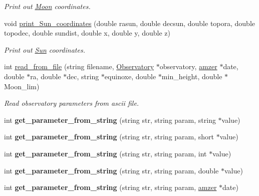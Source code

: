\begin{DoxyCompactItemize}
\begin{DoxyCompactList}\small\item\em Print out \hyperlink{class_moon}{Moon} coordinates. \end{DoxyCompactList}\item 
\hypertarget{class_observatory_a10149ab9daaed20dcb077412c07769ac}{void \hyperlink{class_observatory_a10149ab9daaed20dcb077412c07769ac}{print\-\_\-\-Sun\-\_\-coordinates} (double rasun, double decsun, double topora, double topodec, double sundist, double x, double y, double z)}\label{class_observatory_a10149ab9daaed20dcb077412c07769ac}

\begin{DoxyCompactList}\small\item\em Print out \hyperlink{class_sun}{Sun} coordinates. \end{DoxyCompactList}\item 
\hypertarget{class_observatory_ae9a3b0646ec53cf4a51881abe6889e05}{int \hyperlink{class_observatory_ae9a3b0646ec53cf4a51881abe6889e05}{read\-\_\-from\-\_\-file} (string filename, \hyperlink{class_observatory}{Observatory} $\ast$observatory, \hyperlink{classamzer}{amzer} $\ast$date, double $\ast$ra, double $\ast$dec, string $\ast$equinoxe, double $\ast$min\-\_\-height, double $\ast$Moon\-\_\-lim)}\label{class_observatory_ae9a3b0646ec53cf4a51881abe6889e05}

\begin{DoxyCompactList}\small\item\em Read observatory parameters from ascii file. \end{DoxyCompactList}\item 
\hypertarget{class_observatory_a3121cf61f411c22997b2af6b1915cf2f}{int {\bfseries get\-\_\-parameter\-\_\-from\-\_\-string} (string str, string param, string $\ast$value)}\label{class_observatory_a3121cf61f411c22997b2af6b1915cf2f}

\item 
\hypertarget{class_observatory_a98ef1f7b16108ccbb64e8a9d00c17049}{int {\bfseries get\-\_\-parameter\-\_\-from\-\_\-string} (string str, string param, short $\ast$value)}\label{class_observatory_a98ef1f7b16108ccbb64e8a9d00c17049}

\item 
\hypertarget{class_observatory_a7cb678e1d25f6957e86ad1653250cc9d}{int {\bfseries get\-\_\-parameter\-\_\-from\-\_\-string} (string str, string param, int $\ast$value)}\label{class_observatory_a7cb678e1d25f6957e86ad1653250cc9d}

\item 
\hypertarget{class_observatory_a189d4521b3ebdcb11a326fc82ad0c18d}{int {\bfseries get\-\_\-parameter\-\_\-from\-\_\-string} (string str, string param, double $\ast$value)}\label{class_observatory_a189d4521b3ebdcb11a326fc82ad0c18d}

\item 
\hypertarget{class_observatory_a5a752c67a747b36f08aa85e09e75de54}{int {\bfseries get\-\_\-parameter\-\_\-from\-\_\-string} (string str, string param, \hyperlink{classamzer}{amzer} $\ast$date)}\label{class_observatory_a5a752c67a747b36f08aa85e09e75de54}

\end{DoxyCompactItemize}
